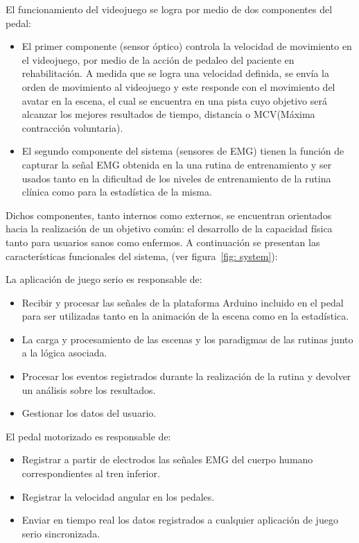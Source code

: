 El funcionamiento del videojuego se logra por medio de dos componentes del pedal:
\begin{itemize}
    \item El primer componente (sensor óptico) controla la velocidad de movimiento en el videojuego, por
    medio de la acción de pedaleo del paciente en rehabilitación. A medida que se logra una velocidad definida, se envía la orden de movimiento al videojuego y este responde con el movimiento del avatar en la escena, el cual se encuentra en una pista cuyo objetivo será alcanzar los mejores resultados de tiempo, distancia o  MCV(Máxima contracción voluntaria).
    \item El segundo componente del sistema (sensores de EMG) tienen la función de capturar la señal EMG obtenida en la una rutina de entrenamiento y ser usados tanto en la dificultad de los niveles de entrenamiento de la rutina clínica como para la estadística de la misma.
\end{itemize}
    
Dichos componentes, tanto internos como externos, se encuentran orientados hacia  la realización de un objetivo común: el desarrollo de la capacidad física tanto para usuarios sanos como enfermos. A continuación se presentan las características funcionales del sistema, (ver figura~\ref{fig: system}):

\vspace{5pt}
La aplicación de juego serio es responsable de:
\begin{itemize}
    \item Recibir y procesar las señales de la plataforma Arduino incluido en el pedal para ser utilizadas tanto en la animación de la escena como en la estadística.
    \item La carga y procesamiento de las escenas y los paradigmas de las rutinas junto a la lógica asociada. 
    \item Procesar los eventos registrados durante la realización de la rutina y devolver un análisis sobre los resultados.
    \item Gestionar los datos del usuario.
\end{itemize}

\vspace{5pt}
El pedal motorizado es responsable de:
\begin{itemize}
    \item Registrar a partir de electrodos las señales EMG del cuerpo humano correspondientes al tren inferior.
    \item Registrar la velocidad angular en los pedales.
    \item Enviar en tiempo real los datos registrados a cualquier aplicación de juego serio sincronizada.
\end{itemize}
    
